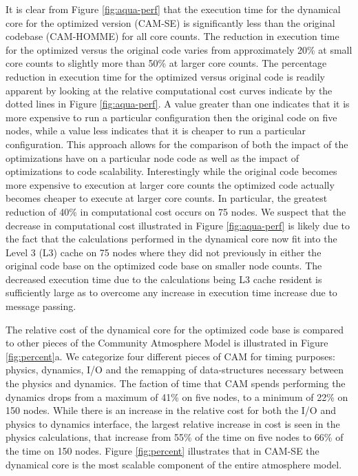 \documentclass{agujournal}
\begin{document}
{It is clear from Figure \ref{fig:aqua-perf} that the execution time for the dynamical core for the optimized version (CAM-SE) is significantly less than the original codebase (CAM-HOMME) for all core counts. The reduction in execution time for the optimized versus the original code varies from approximately 20\% at small core counts to slightly more than 50\% at larger core counts. The percentage reduction in execution time for the optimized versus original code is readily apparent by looking at the relative computational cost curves indicate by the dotted lines in Figure \ref{fig:aqua-perf}.  A value greater than one indicates that it is more expensive to run a particular configuration then the original code on five nodes, while a value less indicates that it is cheaper to run a particular configuration.  This approach allows for the comparison of both the impact of the optimizations have on a particular node code as well as the impact of optimizations to code scalability.  Interestingly while the original code becomes more expensive to execution at larger core counts the optimized code actually becomes cheaper to execute at larger core counts.  In particular, the greatest reduction of 40\% in computational cost occurs on 75 nodes.  We suspect that the decrease in computational cost illustrated in Figure \ref{fig:aqua-perf} is likely due to the fact that the calculations performed in the dynamical core now fit into the Level 3 (L3) cache on 75 nodes where they did not previously in either the original code base on the optimized code base on smaller node counts.  The decreased execution time due to the calculations being L3 cache resident is sufficiently large as to overcome any increase in execution time increase due to message passing.  

The relative cost of the dynamical core for the optimized code base is compared to other pieces of the Community Atmosphere Model is illustrated in Figure \ref{fig:percent}a. We categorize four different pieces of CAM for timing purposes: physics, dynamics, I/O and the remapping of data-structures necessary between the physics and dynamics.  The faction of time that CAM spends performing the dynamics drops from a maximum of 41\% on five nodes, to a minimum of 22\% on 150 nodes.  While there is an increase in the relative cost for both the I/O and physics to dynamics interface, the largest relative increase in cost is seen in the physics calculations, that increase from 55\% of the time on five nodes to 66\% of the time on 150 nodes.  Figure \ref{fig:percent} illustrates that in CAM-SE the dynamical core is the most scalable component of the entire atmosphere model.  

}
\end{document}
